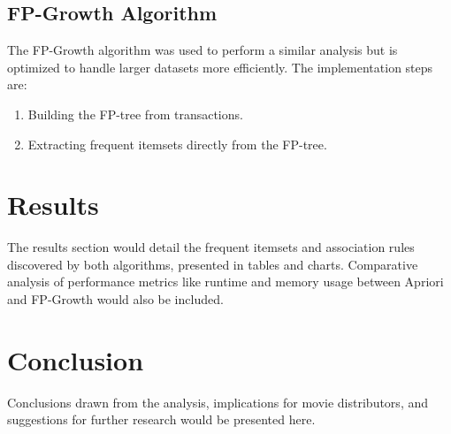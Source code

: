 \documentclass{article}
\begin{document}
\subsection{FP-Growth Algorithm}
The FP-Growth algorithm was used to perform a similar analysis but is optimized to handle larger datasets more efficiently. The implementation steps are:
\begin{enumerate}
    \item Building the FP-tree from transactions.
    \item Extracting frequent itemsets directly from the FP-tree.
\end{enumerate}

\section{Results}
The results section would detail the frequent itemsets and association rules discovered by both algorithms, presented in tables and charts. Comparative analysis of performance metrics like runtime and memory usage between Apriori and FP-Growth would also be included.

\section{Conclusion}
Conclusions drawn from the analysis, implications for movie distributors, and suggestions for further research would be presented here.
\end{document}
